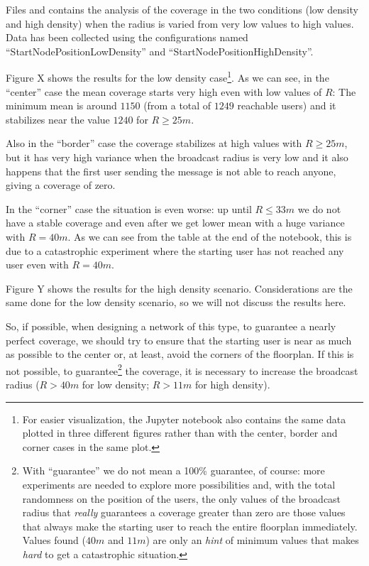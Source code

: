 Files  and  contains the
analysis of the coverage in the two conditions (low density and high density)
when the radius is varied from very low values to high values. Data has been
collected using the configurations named ``StartNodePositionLowDensity'' and
``StartNodePositionHighDensity''.

Figure X shows the results for the low density case\footnote{For easier
visualization, the Jupyter notebook also contains the same data plotted in three
different figures rather than with the center, border and corner cases in the
same plot.}. As we can see, in the ``center'' case the mean coverage starts very
high even with low values of \(R\): The minimum mean is around \(1150\) (from a
total of \(1249\) reachable users) and it stabilizes near the value \(1240\)
for \(R \ge 25m\).

Also in the ``border'' case the coverage stabilizes at high values with \(R \ge
25m\), but it has very high variance when the broadcast radius is very low and
it also happens that the first user sending the message is not able to reach
anyone, giving a coverage of zero.

In the ``corner'' case the situation is even worse: up until \(R \le 33m\) we
do not have a stable coverage and even after we get lower mean with a huge
variance with \(R\!=\!40m\). As we can see from the table at the end of the
notebook, this is due to a catastrophic experiment where the starting user has
not reached any user even with \(R\!=\!40m\).

Figure Y shows the results for the high density scenario. Considerations are the
same done for the low density scenario, so we will not discuss the results here.

So, if possible, when designing a network of this type, to guarantee a nearly
perfect coverage, we should try to ensure that the starting user is near as much
as possible to the center or, at least, avoid the corners of the floorplan. If
this is not possible, to guarantee\footnote{With ``guarantee'' we do not mean a
100\% guarantee, of course: more experiments are needed to explore more
possibilities and, with the total randomness on the position of the users, the
only values of the broadcast radius that \emph{really} guarantees a coverage
greater than zero are those values that always make the starting user to reach
the entire floorplan immediately. Values found (\(40m\) and \(11m\)) are only an
\emph{hint} of minimum values that makes \emph{hard} to get a catastrophic
situation.} the coverage, it is necessary to increase the broadcast radius (\(R
> 40m\) for low density; \(R > 11m\) for high density).
